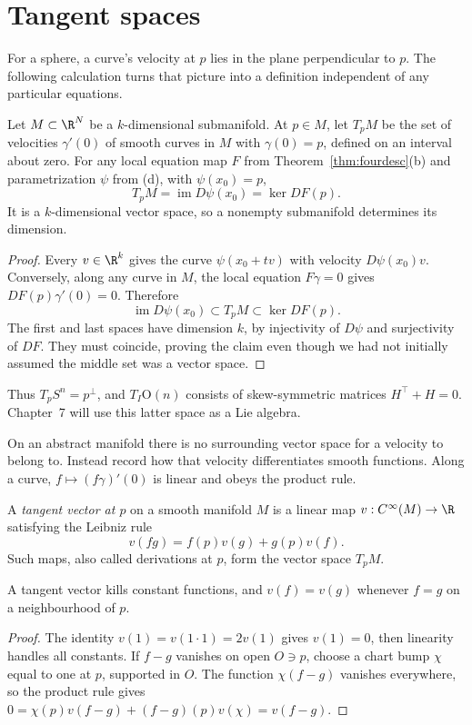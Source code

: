 \section{Tangent spaces}\label{sec:tangent}

For a sphere, a curve's velocity at $p$ lies in the plane perpendicular to $p$. The following calculation turns that picture into a definition independent of any particular equations.

\begin{proposition}\label{prop:tangentsub}
Let $M\subset\R^N$ be a $k$-dimensional submanifold. At $p\in M$, let $T_pM$ be the set of velocities $\gamma'(0)$ of smooth curves in $M$ with $\gamma(0)=p$, defined on an interval about zero. For any local equation map $F$ from Theorem~\ref{thm:fourdesc}(b) and parametrization $\psi$ from (d), with $\psi(x_0)=p$,
\[
T_pM=\operatorname{im}D\psi(x_0)=\ker DF(p).
\]
It is a $k$-dimensional vector space, so a nonempty submanifold determines its dimension.
\end{proposition}
\begin{proof}
Every $v\in\R^k$ gives the curve $\psi(x_0+tv)$ with velocity $D\psi(x_0)v$. Conversely, along any curve in $M$, the local equation $F\gamma=0$ gives $DF(p)\gamma'(0)=0$. Therefore
\[
\operatorname{im}D\psi(x_0)\subset T_pM\subset\ker DF(p).
\]
The first and last spaces have dimension $k$, by injectivity of $D\psi$ and surjectivity of $DF$. They must coincide, proving the claim even though we had not initially assumed the middle set was a vector space.
\end{proof}

Thus $T_pS^n=p^\perp$, and $T_I\mathrm O(n)$ consists of skew-symmetric matrices $H^\top+H=0$. Chapter~7 will use this latter space as a Lie algebra.

On an abstract manifold there is no surrounding vector space for a velocity to belong to. Instead record how that velocity differentiates smooth functions. Along a curve, $f\mapsto(f\gamma)'(0)$ is linear and obeys the product rule.

\begin{definition}
A \emph{tangent vector at $p$} on a smooth manifold $M$ is a linear map $v:C^\infty(M)\to\R$ satisfying the Leibniz rule
\[
v(fg)=f(p)v(g)+g(p)v(f).
\]
Such maps, also called derivations at $p$, form the vector space $T_pM$.
\end{definition}

\begin{lemma}\label{lem:derivlocal}
A tangent vector kills constant functions, and $v(f)=v(g)$ whenever $f=g$ on a neighbourhood of $p$.
\end{lemma}
\begin{proof}
The identity $v(1)=v(1\cdot1)=2v(1)$ gives $v(1)=0$, then linearity handles all constants. If $f-g$ vanishes on open $O\ni p$, choose a chart bump $\chi$ equal to one at $p$, supported in $O$. The function $\chi(f-g)$ vanishes everywhere, so the product rule gives
$0=\chi(p)v(f-g)+(f-g)(p)v(\chi)=v(f-g)$.
\end{proof}

